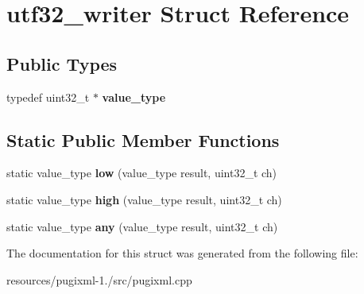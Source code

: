 \hypertarget{structutf32__writer}{\section{utf32\+\_\+writer Struct Reference}
\label{structutf32__writer}
}
\subsection*{Public Types}
\begin{DoxyCompactItemize}
\item 
\hypertarget{structutf32__writer_a2284e1fa3406f113f151ded2aaa8d4ae}{typedef uint32\+\_\+t $\ast$ {\bfseries value\+\_\+type}}\label{structutf32__writer_a2284e1fa3406f113f151ded2aaa8d4ae}

\end{DoxyCompactItemize}
\subsection*{Static Public Member Functions}
\begin{DoxyCompactItemize}
\item 
\hypertarget{structutf32__writer_a06e1b65906f7355ea54a622248095bc7}{static value\+\_\+type {\bfseries low} (value\+\_\+type result, uint32\+\_\+t ch)}\label{structutf32__writer_a06e1b65906f7355ea54a622248095bc7}

\item 
\hypertarget{structutf32__writer_a3f86d996cde3ed7cab5c31930b67c9f1}{static value\+\_\+type {\bfseries high} (value\+\_\+type result, uint32\+\_\+t ch)}\label{structutf32__writer_a3f86d996cde3ed7cab5c31930b67c9f1}

\item 
\hypertarget{structutf32__writer_aa94aaa4a13e755942e7da70ea7700d3e}{static value\+\_\+type {\bfseries any} (value\+\_\+type result, uint32\+\_\+t ch)}\label{structutf32__writer_aa94aaa4a13e755942e7da70ea7700d3e}

\end{DoxyCompactItemize}


The documentation for this struct was generated from the following file\+:\begin{DoxyCompactItemize}
\item 
resources/pugixml-\/1./src/pugixml.\+cpp\end{DoxyCompactItemize}
